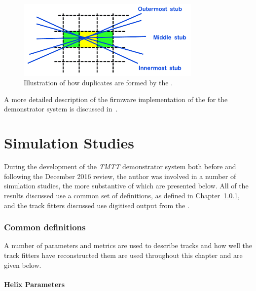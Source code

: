 \begin{figure}[!h]
\centering
\includegraphics[width=0.80\textwidth]{figs/tk-upgrade/A50_algo.pdf}
\caption{Illustration of how duplicates are formed by the \rphi \HT.}
\label{fig:DR}
\end{figure}

A more detailed description of the firmware implementation of the \DR for the demonstrator system is discussed in~\cite{TMTT_JINST}.

\section{Simulation Studies}\label{sec:TmttSimStudies}

During the development of the \emph{TMTT} demonstrator system both before and following the December 2016 review, the author was involved in a number of simulation studies, the more substantive of which are presented below.
All of the results discussed use a common set of definitions, as defined in Chapter~\ref{subsubsec:helixParameter}, and the track fitters discussed use digitised output from the \HT.

\subsubsection{Common definitions}\label{subsubsec:helixParameter}
A number of parameters and metrics are used to describe tracks and how well the track fitters have reconstructed them are used throughout this chapter and are given below.

\paragraph{Helix Parameters}

